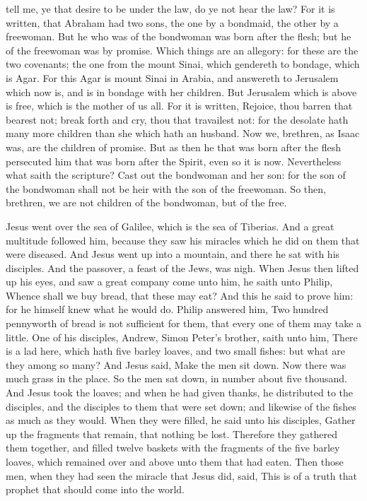  tell me, ye that desire to be under the law, do ye not hear the law? For it is written, that Abraham had two sons, the one by a bondmaid, the other by a freewoman. But he who was of the bondwoman was born after the flesh; but he of the freewoman was by promise. Which things are an allegory: for these are the two covenants; the one from the mount Sinai, which gendereth to bondage, which is Agar. For this Agar is mount Sinai in Arabia, and answereth to Jerusalem which now is, and is in bondage with her children. But Jerusalem which is above is free, which is the mother of us all. For it is written, Rejoice, thou barren that bearest not; break forth and cry, thou that travailest not: for the desolate hath many more children than she which hath an husband. Now we, brethren, as Isaac was, are the children of promise. But as then he that was born after the flesh persecuted him that was born after the Spirit, even so it is now. Nevertheless what saith the scripture? Cast out the bondwoman and her son: for the son of the bondwoman shall not be heir with the son of the freewoman. So then, brethren, we are not children of the bondwoman, but of the free.


 Jesus went over the sea of Galilee, which is the sea of Tiberias. And a great multitude followed him, because they saw his miracles which he did on them that were diseased. And Jesus went up into a mountain, and there he sat with his disciples. And the passover, a feast of the Jews, was nigh. When Jesus then lifted up his eyes, and saw a great company come unto him, he saith unto Philip, Whence shall we buy bread, that these may eat? And this he said to prove him: for he himself knew what he would do. Philip answered him, Two hundred pennyworth of bread is not sufficient for them, that every one of them may take a little. One of his disciples, Andrew, Simon Peter's brother, saith unto him, There is a lad here, which hath five barley loaves, and two small fishes: but what are they among so many? And Jesus said, Make the men sit down. Now there was much grass in the place. So the men sat down, in number about five thousand. And Jesus took the loaves; and when he had given thanks, he distributed to the disciples, and the disciples to them that were set down; and likewise of the fishes as much as they would. When they were filled, he said unto his disciples, Gather up the fragments that remain, that nothing be lost. Therefore they gathered them together, and filled twelve baskets with the fragments of the five barley loaves, which remained over and above unto them that had eaten. Then those men, when they had seen the miracle that Jesus did, said, This is of a truth that prophet that should come into the world.

